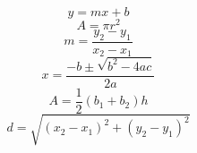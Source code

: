 \documentclass{article}
\begin{document}
\[ y = mx + b \]
\[ A = \pi r^2\]
\[ m = \frac{y_2-y_1}{x_2-x_1} \]
\[ x = \frac{-b\pm\sqrt{b^2-4ac}}{2a} \]
\[ A = \frac{1}{2}(b_1 + b_2)h \]
\[ d = \sqrt{(x_2 - x_1)^2 + (y_2-y_1)^2} \]
\end{document}
